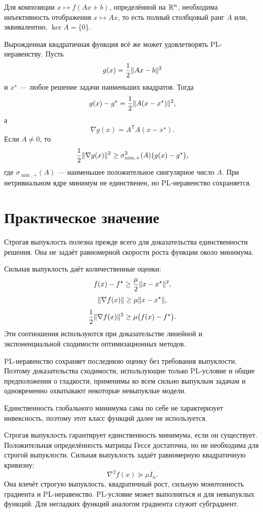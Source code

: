 \begin{remark}
Для композиции \(x\mapsto f(Ax+b)\), определённой на \(\mathbb{R}^n\),
необходима инъективность отображения \(x\mapsto Ax\), то есть полный
столбцовый ранг \(A\) или, эквивалентно, \(\ker A=\{0\}\).
\end{remark}

Вырожденная квадратичная функция всё же может удовлетворять
PL-неравенству. Пусть
\[
    g(x)=\frac12\lVert Ax-b\rVert^2
\]
и \(x^\star\) --- любое решение задачи наименьших квадратов. Тогда
\[
    g(x)-g^\star
    =
    \frac12\lVert A(x-x^\star)\rVert^2,
\]
а
\[
    \nabla g(x)=A^{\mathsf T}A(x-x^\star).
\]
Если \(A\ne0\), то
\[
    \frac12\lVert\nabla g(x)\rVert^2
    \ge
    \sigma_{\min,+}^2(A)\bigl(g(x)-g^\star\bigr),
\]
где \(\sigma_{\min,+}(A)\) --- наименьшее положительное сингулярное
число \(A\). При нетривиальном ядре минимум не единственен, но
PL-неравенство сохраняется.

\section{Практическое значение}

Строгая выпуклость полезна прежде всего для доказательства
единственности решения. Она не задаёт равномерной скорости роста
функции около минимума.

Сильная выпуклость даёт количественные оценки:
\[
    f(x)-f^\star
    \ge
    \frac{\mu}{2}\lVert x-x^\star\rVert^2,
\]
\[
    \lVert\nabla f(x)\rVert
    \ge
    \mu\lVert x-x^\star\rVert,
\]
\[
    \frac12\lVert\nabla f(x)\rVert^2
    \ge
    \mu\bigl(f(x)-f^\star\bigr).
\]
Эти соотношения используются при доказательстве линейной и
экспоненциальной сходимости оптимизационных методов.

PL-неравенство сохраняет последнюю оценку без требования
выпуклости. Поэтому доказательства сходимости, использующие только
PL-условие и общие предположения о гладкости, применимы ко всем
сильно выпуклым задачам и одновременно охватывают некоторые
невыпуклые модели.

Единственность глобального минимума сама по себе не характеризует инвексность, поэтому этот класс функций далее не используется.


Строгая выпуклость гарантирует единственность минимума, если он
существует. Положительная определённость матрицы Гессе достаточна, но
не необходима для строгой выпуклости. Сильная выпуклость задаёт
равномерную квадратичную кривизну:
\[
    \nabla^2f(x)\succeq\mu I_n.
\]
Она влечёт строгую выпуклость, квадратичный рост, сильную
монотонность градиента и PL-неравенство. PL-условие может выполняться
и для невыпуклых функций. Для негладких функций аналогом градиента
служит субградиент.